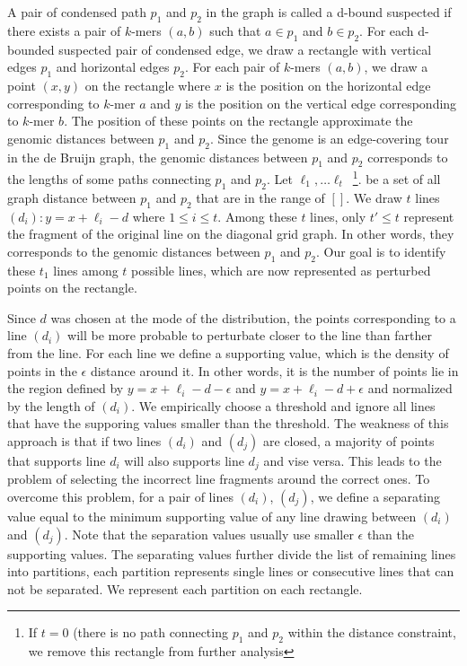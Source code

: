 \documentclass[a4paper]{article}
\begin{document}
A pair of condensed path $p_1$ and $p_2$ in the graph is called a d-bound suspected if there exists 
a pair of $k$-mers $(a,b)$ such that $a \in p_1$ and $b\in p_2$. For each d-bounded suspected pair of condensed edge, we draw a rectangle with
vertical edges $p_1$ and horizontal edges $p_2$. For each pair of $k$-mers $(a,b)$, we draw a point $(x,y)$  on the rectangle 
where $x$ is the position on the horizontal edge corresponding to $k$-mer $a$ and $y$ is the position on the vertical edge 
corresponding to $k$-mer $b$. The position of these points on the rectangle approximate the genomic  distances between $p_1$ 
and $p_2$. Since the genome is an edge-covering tour in the de Bruijn graph,  the genomic distances between $p_1$ and $p_2$ corresponds to
the lengths of some paths connecting $p_1$ and $p_2$. Let ${\ell_1, \ldots \ell_t}$~\footnote{ If $t = 0$ (there is no path
connecting $p_1$ and $p_2$ within the distance constraint, we remove this rectangle from further analysis}. be a set of all graph distance between 
$p_1$ and $p_2$ that are in the range of $[]$.  We draw $t$ lines  $(d_i): y = x +  \ell_i - d$ where $ 1 \leq i \leq t$.  Among 
 these $t$ lines, only $t' \leq t$ represent the fragment of the original line on the diagonal grid graph. In other words, 
    they corresponds to the genomic distances between $p_1$ and $p_2$. 
 Our goal is to identify 
these $t_1$ lines among $t$ possible lines, which are now represented as perturbed points on the rectangle.


    Since $d$ was chosen at the mode of the distribution, the points corresponding to a line $(d_i)$ will be more probable 
to perturbate closer to the line than farther from the line. For each line we define a supporting value, which is the density of 
points in the $\epsilon$ distance around it. In other words, it is the number of points lie in the region defined by
$y = x+  \ell_i - d - \epsilon$ and $y = x + \ell_i -d + \epsilon$ and normalized by the length of $(d_i)$.  We empirically choose 
a threshold and ignore all lines that have the supporing values smaller than the threshold. The weakness of this approach is that 
if two lines $(d_i)$ and $(d_j)$ are closed, a majority of points that supports line $d_i$ will also supports line $d_j$ and vise versa.  
This leads to the problem of selecting the incorrect line fragments around the correct ones. To overcome this problem, for a pair of 
lines $(d_i)$, $(d_j)$, we define a separating value equal to the minimum supporting value of any line drawing between $(d_i)$ and $(d_j)$.
Note that the separation values usually use smaller $\epsilon$ than  the supporting values.  The separating values further divide the 
list of remaining lines into partitions, each partition represents single lines or consecutive lines that can not be separated. We 
represent each partition on each rectangle. 
\end{document}
